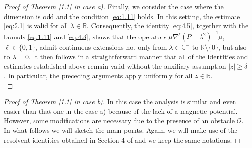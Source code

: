 \documentclass[11pt]{amsart}
\numberwithin{equation}{section}
\def\C{{\mathbb C}}
\def\R{{\mathbb R}}
\begin{document}
\begin{proof}[Proof of Theorem \ref{1.1} in case a)]
Finally, we consider the case where the dimension is odd and the condition \eqref{eq:1.11} holds. In this setting, the estimate \eqref{eq:2.1} is valid for all $\lambda \in \R$. Consequently, the identity \eqref{eq:4.5}, together with the bounds \eqref{eq:1.11} and \eqref{eq:4.8}, shows that the operators $\mu \nabla^{\ell}(P-\lambda^2)^{-1}\mu$, $\ell \in \{0, 1\}$, admit continuous extensions not only from $\lambda\in\C^{-}$ to $\R\setminus\{0\}$, but also to $\lambda=0$. It then follows in a straightforward manner that all of the identities and estimates established above remain valid without the auxiliary assumption $|z|\ge\delta$. In particular, the preceding arguments apply uniformly for all $z\in\R$.\\
 \end{proof}

\begin{proof}[Proof of Theorem \ref{1.1} in case b)]
In this case the analysis is similar and even easier than that one in the case a) because of the lack of a magnetic potential.
However, some modifications are necessary due to the presence of an obstacle $\mathcal{O}$. 
In what follows we will sketch the main points. 
Again, we will make use of the resolvent identities obtained in Section 4 of \cite{kn:LSV} and we keep the same notations. 


\end{proof}
\end{document}
